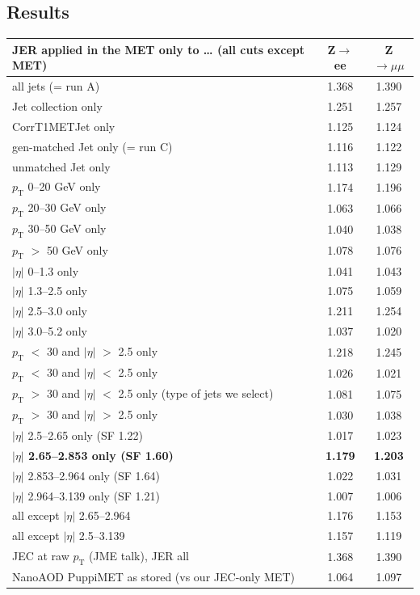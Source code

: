 \documentclass[11pt,a4paper]{article}
\newcommand{\Zee}{Z$\to$ee}
\newcommand{\Zmm}{Z$\to\mu\mu$}
\newcommand{\pt}{$p_\mathrm{T}$}
\newcommand{\aeta}{$|\eta|$}
\begin{document}
\subsection{Results}
\begin{center}
\small
\begin{tabular}{l cc}
\toprule
JER applied in the MET only to \ldots{} (all cuts except MET) & \Zee & \Zmm \\
\midrule
all jets (= run A) & 1.368 & 1.390 \\
\midrule
Jet collection only & 1.251 & 1.257 \\
CorrT1METJet only & 1.125 & 1.124 \\
\midrule
gen-matched Jet only (= run C) & 1.116 & 1.122 \\
unmatched Jet only & 1.113 & 1.129 \\
\midrule
\pt{} 0--20 GeV only & 1.174 & 1.196 \\
\pt{} 20--30 GeV only & 1.063 & 1.066 \\
\pt{} 30--50 GeV only & 1.040 & 1.038 \\
\pt{} $>$ 50 GeV only & 1.078 & 1.076 \\
\midrule
\aeta{} 0--1.3 only & 1.041 & 1.043 \\
\aeta{} 1.3--2.5 only & 1.075 & 1.059 \\
\aeta{} 2.5--3.0 only & 1.211 & 1.254 \\
\aeta{} 3.0--5.2 only & 1.037 & 1.020 \\
\midrule
\pt{} $<$ 30 and \aeta{} $>$ 2.5 only & 1.218 & 1.245 \\
\pt{} $<$ 30 and \aeta{} $<$ 2.5 only & 1.026 & 1.021 \\
\pt{} $>$ 30 and \aeta{} $<$ 2.5 only (type of jets we select) & 1.081 & 1.075 \\
\pt{} $>$ 30 and \aeta{} $>$ 2.5 only & 1.030 & 1.038 \\
\midrule
\aeta{} 2.5--2.65 only (SF 1.22) & 1.017 & 1.023 \\
\textbf{\aeta{} 2.65--2.853 only (SF 1.60)} & \textbf{1.179} & \textbf{1.203} \\
\aeta{} 2.853--2.964 only (SF 1.64) & 1.022 & 1.031 \\
\aeta{} 2.964--3.139 only (SF 1.21) & 1.007 & 1.006 \\
\midrule
all except \aeta{} 2.65--2.964 & 1.176 & 1.153 \\
all except \aeta{} 2.5--3.139 & 1.157 & 1.119 \\
\midrule
JEC at raw \pt{} (JME talk), JER all & 1.368 & 1.390 \\
NanoAOD PuppiMET as stored (vs our JEC-only MET) & 1.064 & 1.097 \\
\bottomrule
\end{tabular}
\end{center}
\end{document}
